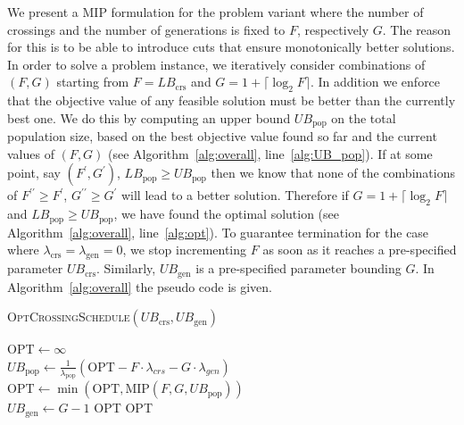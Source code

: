 \documentclass[runningheads]{llncs}
\begin{document}
We present a MIP formulation for the problem variant where the number of crossings and the number of generations is fixed to $F$, respectively $G$. The reason for this is to be able to introduce cuts that ensure monotonically better solutions. In order to solve a problem instance, we iteratively consider combinations of $(F,G)$ starting from $F = \mathit{LB}_\mathrm{crs}$ and $G = 1 + \lceil \log_2 F \rceil$. In addition we enforce that the objective value of any feasible solution must be better than the currently best one. We do this by computing an upper bound $\mathit{UB}_\mathrm{pop}$ on the total population size, based on the best objective value found so far and the current values of $(F,G)$ (see Algorithm~\ref{alg:overall}, line~\ref{alg:UB_pop}). If at some point, say $(F^\prime,G^\prime)$, $\mathit{LB}_\mathrm{pop} \geq \mathit{UB}_\mathrm{pop}$ then we know that none of the combinations of $F^{\prime\prime} \geq F^\prime$, $G^{\prime\prime} \geq G^\prime$ will lead to a better solution. Therefore if $G = 1 + \lceil \log_2 F \rceil$ and $\mathit{LB}_\mathrm{pop} \geq \mathit{UB}_\mathrm{pop}$, we have found the optimal solution (see Algorithm~\ref{alg:overall}, line~\ref{alg:opt}). To guarantee termination for the case where $\lambda_\mathrm{crs} = \lambda_\mathrm{gen} = 0$, we stop incrementing $F$ as soon as it reaches a pre-specified parameter $\mathit{UB}_\mathrm{crs}$. Similarly, $\mathit{UB}_\mathrm{gen}$ is a pre-specified parameter bounding $G$. In Algorithm~\ref{alg:overall} the pseudo code is given.

\begin{algorithm2e}[h!]
\caption{\textsc{OptCrossingSchedule}$(\mathit{UB}_\mathrm{crs},\mathit{UB}_\mathrm{gen})$}
\label{alg:overall}
$\mbox{OPT} \leftarrow \infty$\\
{
  {
   $\mathit{UB}_\mathrm{pop} \leftarrow \frac{1}{\lambda_\mathrm{pop}}(\mbox{OPT}-F\cdot\lambda_{crs}-G\cdot\lambda_{gen})$\\
     
    {
      $\mbox{OPT} \leftarrow \min(\mbox{OPT}, \mbox{MIP}(F,G,\mathit{UB}_\mathrm{pop}))$\\
    }
    \lElse
    {
      $\mathit{UB}_\mathrm{gen} \leftarrow G - 1$
    }
  }
  {
    \Return OPT
  }
}
  \Return OPT\\
\end{algorithm2e}
\end{document}
